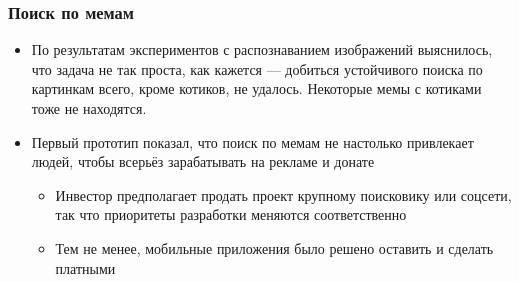 \documentclass[xetex,mathserif,serif]{beamer}
\begin{document}
	\begin{frame}
		\frametitle{Поиск по мемам}
		\begin{itemize}
			\item По результатам экспериментов с распознаванием изображений выяснилось, что задача не так проста, как кажется --- добиться устойчивого поиска по картинкам всего, кроме котиков, не удалось. Некоторые мемы с котиками тоже не находятся.
			\item Первый прототип показал, что поиск по мемам не настолько привлекает людей, чтобы всерьёз зарабатывать на рекламе и донате
			\begin{itemize}
				\item Инвестор предполагает продать проект крупному поисковику или соцсети, так что приоритеты разработки меняются соответственно
				\item Тем не менее, мобильные приложения было решено оставить и сделать платными
			\end{itemize}
		\end{itemize}
	\end{frame}
\end{document}
